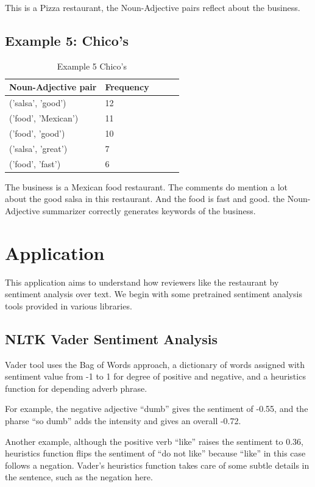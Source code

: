 \documentclass[sigconf]{acmart}
\begin{document}
This is a Pizza restaurant, the Noun-Adjective pairs reflect about the business.

\subsection{Example 5: Chico's}
\begin{table}
  \caption{Example 5 Chico's}
  \label{tab:n_adj_5}
  \begin{tabular}{lllll}
    \toprule
    Noun-Adjective pair & Frequency \\
    \midrule
    ('salsa', 'good') & 12\\
    ('food', 'Mexican') & 11\\
    ('food', 'good') & 10\\
    ('salsa', 'great') & 7\\
    ('food', 'fast') & 6\\
\end{tabular}
\end{table}
The business is a Mexican food restaurant. The comments do mention a lot about the good salsa in this restaurant. And the food is fast and good. the Noun-Adjective summarizer correctly generates keywords of the business.

\section{Application}
This application aims to understand how reviewers like the restaurant by sentiment analysis over text. We begin with some pretrained sentiment analysis tools provided in various libraries.  

\subsection{NLTK Vader Sentiment Analysis}

Vader tool\cite{Vader} uses the Bag of Words approach, a dictionary of words assigned with sentiment value from -1 to 1 for degree of positive and negative, and a heuristics function for depending adverb phrase. 

For example, the negative adjective “dumb” gives the sentiment of -0.55, and the pharse “so dumb” adds the intensity and gives an overall -0.72. 

Another example, although the positive verb “like” raises the sentiment to 0.36, heuristics function flips the sentiment of “do not like” because “like” in this case follows a negation. Vader’s heuristics function takes care of some subtle details in the sentence, such as the negation here.
\end{document}
